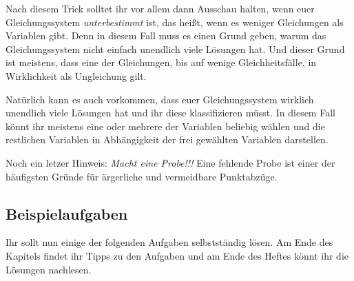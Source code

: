 Nach diesem Trick solltet ihr vor allem dann Ausschau halten, wenn euer Gleichungssystem \emph{unterbestimmt} ist, das heißt, wenn es weniger Gleichungen als Variablen gibt. Denn in diesem Fall muss es einen Grund geben, warum das Gleichungssystem nicht einfach unendlich viele Lösungen hat. Und dieser Grund ist meistens, dass eine der Gleichungen, bis auf wenige Gleichheitsfälle, in Wirklichkeit als Ungleichung gilt.

Natürlich kann es auch vorkommen, dass euer Gleichungssystem wirklich unendlich viele Lösungen hat und ihr diese klassifizieren müsst. In diesem Fall könnt ihr meistens eine oder mehrere der Variablen beliebig wählen und die restlichen Variablen in Abhängigkeit der frei gewählten Variablen darstellen.

Noch ein letzer Hinweis: \emph{Macht eine Probe!!!} Eine fehlende Probe ist einer der häufigsten Gründe für ärgerliche und vermeidbare Punktabzüge.

\subsection*{Beispielaufgaben}

Ihr sollt nun einige der folgenden Aufgaben selbstständig lösen. Am Ende des Kapitels findet ihr Tipps zu den Aufgaben und am Ende des Heftes könnt ihr die Lösungen nachlesen.


